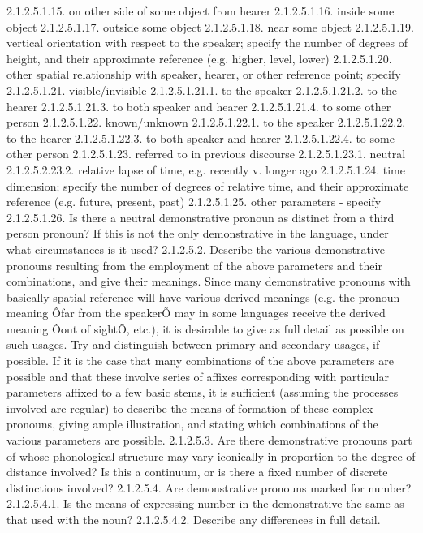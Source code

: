 2.1.2.5.1.15. on other side of some object from hearer
2.1.2.5.1.16. inside some object
2.1.2.5.1.17. outside some object
2.1.2.5.1.18. near some object
2.1.2.5.1.19. vertical orientation with respect to the speaker; specify the number of degrees of height, and their approximate reference (e.g. higher, level, lower)
2.1.2.5.1.20. other spatial relationship with speaker, hearer, or other reference point; specify
2.1.2.5.1.21. visible/invisible
2.1.2.5.1.21.1. to the speaker
2.1.2.5.1.21.2. to the hearer
2.1.2.5.1.21.3. to both speaker and hearer
2.1.2.5.1.21.4. to some other person
2.1.2.5.1.22. known/unknown
2.1.2.5.1.22.1. to the speaker
2.1.2.5.1.22.2. to the hearer
2.1.2.5.1.22.3. to both speaker and hearer
2.1.2.5.1.22.4. to some other person
2.1.2.5.1.23. referred to in previous discourse
2.1.2.5.1.23.1. neutral
2.1.2.5.2.23.2. relative lapse of time, e.g. recently v. longer ago
2.1.2.5.1.24. time dimension; specify the number of degrees of relative time, and their approximate reference (e.g. future, present, past)
2.1.2.5.1.25. other parameters - specify
2.1.2.5.1.26. Is there a neutral demonstrative pronoun as distinct from a third person pronoun? If this is not the only demonstrative in the language, under what circumstances is it used?
2.1.2.5.2. Describe the various demonstrative pronouns resulting from the employment of the above parameters and their combinations, and give their meanings.
Since many demonstrative pronouns with basically spatial reference will have various derived meanings (e.g. the pronoun meaning Ôfar from the speakerÕ may in some languages receive the derived meaning Ôout of sightÕ, etc.), it is desirable to give as full detail as possible on such usages. Try and distinguish between primary and secondary usages, if possible. If it is the case that many combinations of the above parameters are possible and that these involve series of affixes corresponding with particular parameters affixed to a few basic stems, it is sufficient (assuming the processes involved are regular) to describe the means of formation of these complex pronouns, giving ample illustration, and stating which combinations of the various parameters are possible.
2.1.2.5.3. Are there demonstrative pronouns part of whose phonological structure may vary iconically in proportion to the degree of distance involved? Is this a continuum, or is there a fixed number of discrete distinctions involved?
2.1.2.5.4. Are demonstrative pronouns marked for number?
2.1.2.5.4.1. Is the means of expressing number in the demonstrative the same as that used with the noun?
2.1.2.5.4.2. Describe any differences in full detail.
